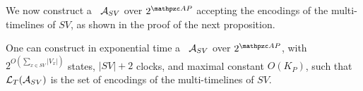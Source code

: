 We now construct a \TA\ $\mathcal{A}_{SV}$ over $2^{\Prop}$ accepting the encodings of the multi-timelines of $SV$,
as shown in the proof of the next proposition. %

 \begin{proposition}\label{prop:AtutomataForMultiTimeline} One can construct in exponential time a \TA\ $\mathcal{A}_{SV}$ over $2^{\Prop}$, with $2^{O(\sum_{x\in SV}|V_x|)}$ states, $|SV|+2$ clocks, and
 maximal constant $O(K_P)$, such that ${\mathcal{L}_T}(\mathcal{A}_{SV})$ is the set of encodings of the multi-timelines of $SV$.
 \end{proposition}
